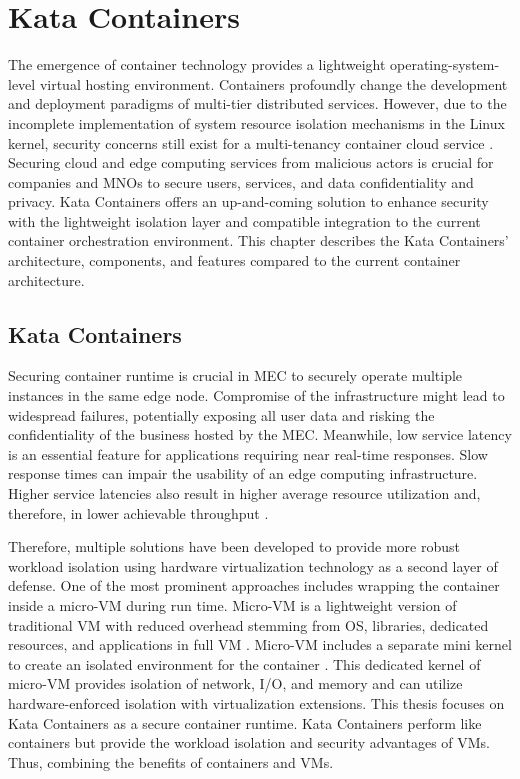 \chapter{Kata Containers}
\label{chapter:katacontainers}

The emergence of container technology provides a lightweight operating-system-level virtual hosting environment. Containers profoundly change the development and deployment paradigms of multi-tier distributed services. However, due to the incomplete implementation of system resource isolation mechanisms in the Linux kernel, security concerns still exist for a multi-tenancy container cloud service \cite{Gao2017}. Securing cloud and edge computing services from malicious actors is crucial for companies and MNOs to secure users, services, and data confidentiality and privacy. Kata Containers offers an up-and-coming solution to enhance security with the lightweight isolation layer and compatible integration to the current container orchestration environment. This chapter describes the Kata Containers' architecture, components, and features compared to the current container architecture.

\section{Kata Containers}

Securing container runtime is crucial in MEC to securely operate multiple instances in the same edge node. Compromise of the infrastructure might lead to widespread failures, potentially exposing all user data and risking the confidentiality of the business hosted by the MEC. Meanwhile, low service latency is an essential feature for applications requiring near real-time responses. Slow response times can impair the usability of an edge computing infrastructure. Higher service latencies also result in higher average resource utilization and, therefore, in lower achievable throughput \cite{EverartsdeVelp2020}.

Therefore, multiple solutions have been developed to provide more robust workload isolation using hardware virtualization technology as a second layer of defense. One of the most prominent approaches includes wrapping the container inside a micro-VM during run time. Micro-VM is a lightweight version of traditional VM with reduced overhead stemming from OS, libraries, dedicated resources, and applications in full VM \cite{Flauzac2020}. Micro-VM includes a separate mini kernel to create an isolated environment for the container \cite{Kumar2020}. This dedicated kernel of micro-VM provides isolation of network, I/O, and memory and can utilize hardware-enforced isolation with virtualization extensions. This thesis focuses on Kata Containers as a secure container runtime. Kata Containers perform like containers but provide the workload isolation and security advantages of VMs. Thus, combining the benefits of containers and VMs. \cite{KataContainers}

